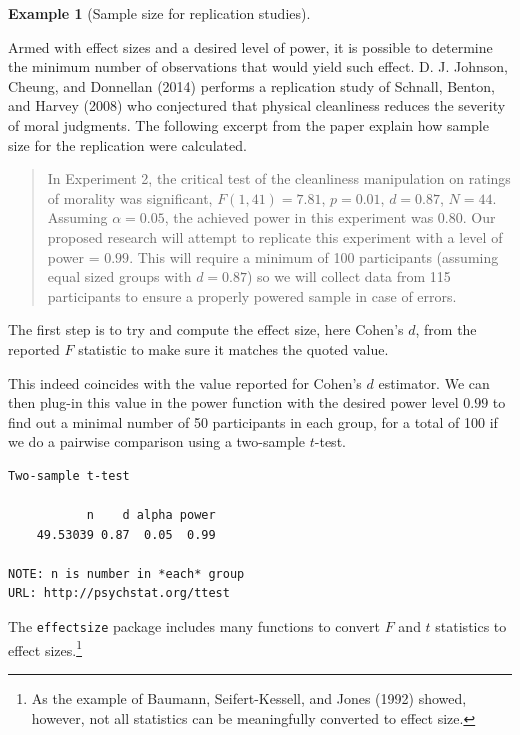 \documentclass[
  11pt,
  letterpaper,
]{scrbook}
\theoremstyle{definition}
\newtheorem{example}{Example}[chapter]
\theoremstyle{definition}
\theoremstyle{remark}
\begin{document}
\begin{example}[Sample size for replication
studies]\protect\hypertarget{exm-power2}{}\label{exm-power2}

Armed with effect sizes and a desired level of power, it is possible to
determine the minimum number of observations that would yield such
effect. D. J. Johnson, Cheung, and Donnellan (2014) performs a
replication study of Schnall, Benton, and Harvey (2008) who conjectured
that physical cleanliness reduces the severity of moral judgments. The
following excerpt from the paper explain how sample size for the
replication were calculated.

\begin{quote}
In Experiment 2, the critical test of the cleanliness manipulation on
ratings of morality was significant, \(F(1, 41) = 7.81\), \(p=0.01\),
\(d=0.87\), \(N=44\). Assuming \(\alpha=0.05\), the achieved power in
this experiment was \(0.80\). Our proposed research will attempt to
replicate this experiment with a level of power = \(0.99\). This will
require a minimum of 100 participants (assuming equal sized groups with
\(d=0.87\)) so we will collect data from 115 participants to ensure a
properly powered sample in case of errors.
\end{quote}

The first step is to try and compute the effect size, here Cohen's
\(d\), from the reported \(F\) statistic to make sure it matches the
quoted value.

This indeed coincides with the value reported for Cohen's \(d\)
estimator. We can then plug-in this value in the power function with the
desired power level \(0.99\) to find out a minimal number of 50
participants in each group, for a total of 100 if we do a pairwise
comparison using a two-sample \(t\)-test.

\begin{verbatim}
Two-sample t-test

           n    d alpha power
    49.53039 0.87  0.05  0.99

NOTE: n is number in *each* group
URL: http://psychstat.org/ttest
\end{verbatim}

The \texttt{effectsize} package includes many functions to convert \(F\)
and \(t\) statistics to effect sizes.\footnote{As the example of
  Baumann, Seifert-Kessell, and Jones (1992) showed, however, not all
  statistics can be meaningfully converted to effect size.}

\end{example}
\end{document}
